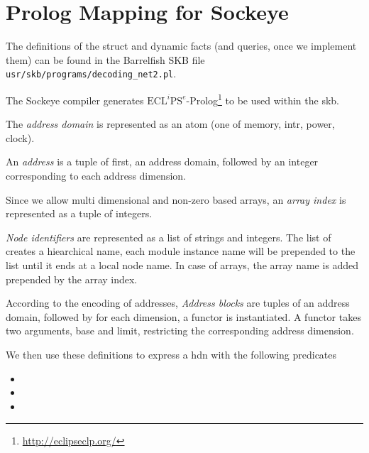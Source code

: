 \documentclass[a4paper,11pt,twoside]{report}
\begin{document}
{{{%
\chapter{Prolog Mapping for Sockeye}
\label{chap:prolog}

The definitions of the struct and dynamic facts (and queries, once we implement
them) can be found in the Barrelfish SKB file \texttt{usr/skb/programs/decoding\_net2.pl}.

The Sockeye compiler generates \(\text{ECL}^i\text{PS}^e\)-Prolog\footnote{\href{http://eclipseclp.org/}{http://eclipseclp.org/}} to be used within the \gls{skb}.

The \textit{address domain} is represented as an atom (one of memory, intr,
power, clock).

An \textit{address} is a tuple of first, an address domain, followed by
an integer corresponding to each address dimension.

Since we allow multi dimensional and non-zero based arrays, an \textit{array
index} is represented as a tuple of integers.

\textit{Node identifiers} are represented as a list of strings and integers.
The list of creates a hiearchical name, each module instance name will be
prepended to the list until it ends at a local node name. In case of arrays,
the array name is added prepended by the array index.

According to the encoding of addresses, \textit{Address blocks} are tuples of
an address domain, followed by for each dimension, a  functor is
instantiated. A  functor takes two arguments, base and limit,
restricting the corresponding address dimension.

We then use these definitions to express a \gls{hdn} with the following predicates
\begin{itemize}
    \item {}
    \item {}
    \item {}
\end{itemize}

}}}
\end{document}
